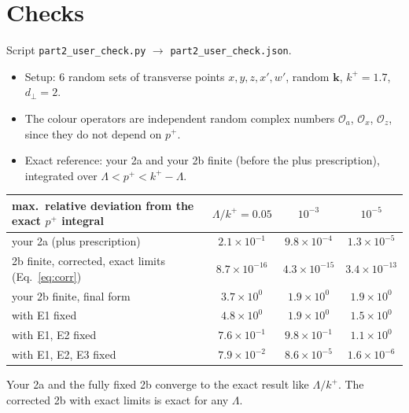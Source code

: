 \documentclass[10pt]{article}
\numberwithin{equation}{section}
\newcommand{\Ox}{\mathcal O_x}
\newcommand{\Oz}{\mathcal O_z}
\begin{document}
\section{Checks}\label{sec:checks}
Script \texttt{part2\_user\_check.py} $\to$ \texttt{part2\_user\_check.json}.
\begin{itemize}
\item Setup: 6 random sets of transverse points $x,y,z,x',w'$, random $\mathbf k$, $k^+=1.7$, $d_\perp=2$.
\item The colour operators are independent random complex numbers $\mathcal O_a$, $\Ox$, $\Oz$, since they do not depend on $p^+$.
\item Exact reference: your 2a and your 2b finite (before the plus prescription), integrated over $\Lambda<p^+<k^+-\Lambda$.
\end{itemize}
\begin{center}\small
\begin{tabular}{@{}lccc@{}}\toprule
max.\ relative deviation from the exact $p^+$ integral & $\Lambda/k^+=0.05$ & $10^{-3}$ & $10^{-5}$\\\midrule
your 2a (plus prescription) & $2.1\times10^{-1}$ & $9.8\times10^{-4}$ & $1.3\times10^{-5}$\\
2b finite, corrected, exact limits (Eq.~\eqref{eq:corr}) & $8.7\times10^{-16}$ & $4.3\times10^{-15}$ & $3.4\times10^{-13}$\\
your 2b finite, final form & $3.7\times10^{0}$ & $1.9\times10^{0}$ & $1.9\times10^{0}$\\
\quad with E1 fixed & $4.8\times10^{0}$ & $1.9\times10^{0}$ & $1.5\times10^{0}$\\
\quad with E1, E2 fixed & $7.6\times10^{-1}$ & $9.8\times10^{-1}$ & $1.1\times10^{0}$\\
\quad with E1, E2, E3 fixed & $7.9\times10^{-2}$ & $8.6\times10^{-5}$ & $1.6\times10^{-6}$\\
\bottomrule
\end{tabular}
\end{center}
Your 2a and the fully fixed 2b converge to the exact result like $\Lambda/k^+$. The corrected 2b with exact limits is exact for any $\Lambda$.
\end{document}
